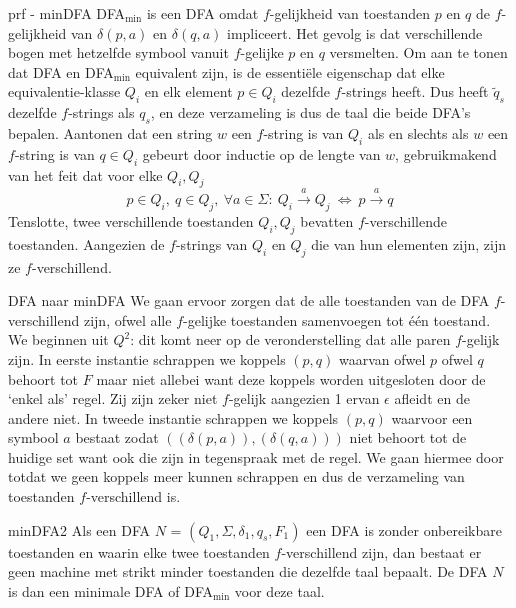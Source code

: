 \begin{prf}{prf - minDFA}
    DFA$_{\text{min}}$ is een DFA omdat $f$-gelijkheid van toestanden $p$ en $q$ de $f$-gelijkheid van \(\delta(p,a)\) en \(\delta(q,a)\) impliceert. Het gevolg is dat verschillende bogen met hetzelfde symbool
    vanuit $f$-gelijke $p$ en $q$ versmelten. Om aan te tonen dat DFA en DFA$_{\text{min}}$ equivalent zijn, is de essentiële eigenschap dat elke equivalentie-klasse $Q_i$ en elk element \(p \in Q_i\)
    dezelfde $f$-strings heeft. Dus heeft $\tilde{q}_s$ dezelfde $f$-strings als $q_s$, en deze verzameling is dus de taal die beide DFA's bepalen. Aantonen dat een string $w$ een $f$-string is van $Q_i$
    als en slechts als $w$ een $f$-string is van \(q \in Q_i\) gebeurt door inductie op de lengte van $w$, gebruikmakend van het feit dat voor elke \(Q_i,Q_j\)
    \begin{equation*}
        p \in Q_i, \ q \in Q_j, \ \forall a \in \Sigma: \ Q_i \overset{a}{\longrightarrow} Q_j \ \Leftrightarrow \ p \overset{a}{\longrightarrow} q 
    \end{equation*}
    Tenslotte, twee verschillende toestanden $Q_i, Q_j$ bevatten $f$-verschillende toestanden. Aangezien de $f$-strings van $Q_i$ en $Q_j$ die van hun elementen zijn, zijn ze $f$-verschillend.
\end{prf}

\newpage

\begin{alg}{DFA naar minDFA}
    We gaan ervoor zorgen dat de alle toestanden van de DFA $f$-verschillend zijn, ofwel alle $f$-gelijke toestanden samenvoegen tot één toestand. We beginnen uit $Q^2$: dit komt neer op de veronderstelling dat alle paren $f$-gelijk zijn. In eerste instantie schrappen we koppels $(p,q)$ waarvan ofwel $p$ ofwel $q$ behoort tot $F$ maar niet allebei want deze koppels worden uitgesloten door de `enkel als' regel. Zij zijn zeker niet $f$-gelijk aangezien 1 ervan $\epsilon$ afleidt en de andere niet. In tweede instantie schrappen we koppels $(p,q)$ waarvoor een symbool $a$ bestaat zodat $((\delta(p,a)),(\delta(q,a)))$ niet behoort tot de huidige set want ook die zijn in tegenspraak met de regel. We gaan hiermee door totdat we geen koppels meer kunnen schrappen en dus de verzameling van toestanden $f$-verschillend is. 
\end{alg}

\begin{lem}{minDFA2}
    Als een DFA $N$ = $(Q_1,\Sigma, \delta_1, q_s, F_1)$  een DFA is zonder onbereikbare toestanden en waarin elke twee toestanden $f$-verschillend zijn, dan bestaat er geen machine met strikt minder toestanden die dezelfde taal bepaalt. De DFA $N$ is dan een minimale DFA of DFA$_{\text{min}}$ voor deze taal.

\end{lem}


